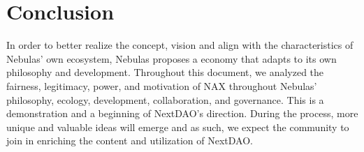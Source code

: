 \section{Conclusion}
In order to better realize the concept, vision and align with the characteristics of Nebulas' own ecosystem, Nebulas proposes a economy that adapts to its own philosophy and development. Throughout this document, we analyzed the fairness, legitimacy, power, and motivation of NAX throughout Nebulas' philosophy, ecology, development, collaboration, and governance. This is a demonstration and a beginning of NextDAO's direction. During the process, more unique and valuable ideas will emerge and as such, we expect the community to join in enriching the content and utilization of NextDAO.
